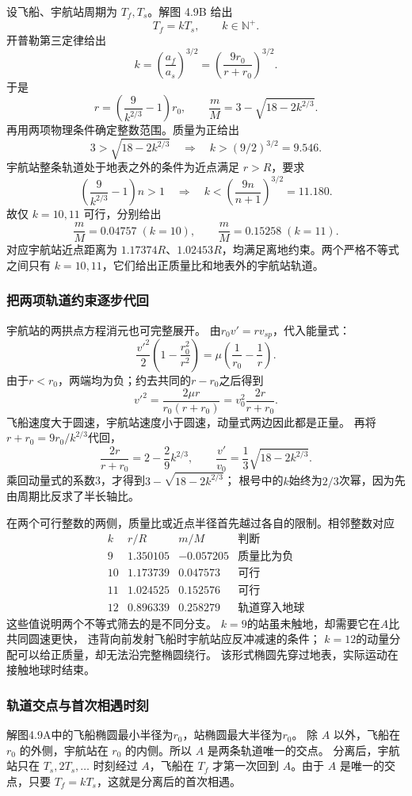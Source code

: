 \documentclass[UTF8,fontset=fandol,a4paper,11pt]{ctexart}
\begin{document}
设飞船、宇航站周期为 $T_f,T_s$。解图 4.9B 给出
\[
T_f=kT_s,\qquad k\in\mathbb N^+.
\]
开普勒第三定律给出
\[
k=\left(\frac{a_f}{a_s}\right)^{3/2}
=\left(\frac{9r_0}{r+r_0}\right)^{3/2}.
\]
于是
\[
r=\left(\frac9{k^{2/3}}-1\right)r_0,
\qquad \boxed{\frac mM=3-\sqrt{18-2k^{2/3}}}.
\]
再用两项物理条件确定整数范围。质量为正给出
\[
3>\sqrt{18-2k^{2/3}}
\quad\Longrightarrow\quad k>(9/2)^{3/2}=9.546.
\]
宇航站整条轨道处于地表之外的条件为近点满足 $r>R$，要求
\[
\left(\frac9{k^{2/3}}-1\right)n>1
\quad\Longrightarrow\quad
k<\left(\frac{9n}{n+1}\right)^{3/2}=11.180.
\]
故仅 $k=10,11$ 可行，分别给出
\[
\boxed{\frac mM=0.04757\;(k=10),\qquad
\frac mM=0.15258\;(k=11)}.
\]
对应宇航站近点距离为 $1.17374R$、$1.02453R$，均满足离地约束。两个严格不等式之间只有 $k=10,11$，它们给出正质量比和地表外的宇航站轨道。
\subsubsection*{把两项轨道约束逐步代回}
宇航站的两拱点方程消元也可完整展开。
由$r_0v'=rv_{sp}$，代入能量式：
\[
\frac{v'^2}2\left(1-\frac{r_0^2}{r^2}\right)
=\mu\left(\frac1{r_0}-\frac1r\right).
\]
由于$r<r_0$，两端均为负；约去共同的$r-r_0$之后得到
\[
v'^2=\frac{2\mu r}{r_0(r+r_0)}
=v_0^2\frac{2r}{r+r_0}.
\]
飞船速度大于圆速，宇航站速度小于圆速，动量式两边因此都是正量。
再将$r+r_0=9r_0/k^{2/3}$代回，
\[
\frac{2r}{r+r_0}
=2-\frac{2}{9}k^{2/3},\qquad
\frac{v'}{v_0}=\frac13\sqrt{18-2k^{2/3}}.
\]
乘回动量式的系数3，才得到$3-\sqrt{18-2k^{2/3}}$；
根号中的$k$始终为$2/3$次幂，因为先由周期比反求了半长轴比。

在两个可行整数的两侧，质量比或近点半径首先越过各自的限制。相邻整数对应
\[
\begin{array}{c|c|c|l}
k&r/R&m/M&\text{判断}\\ \hline
9&1.350105&-0.057205&\text{质量比为负}\\
10&1.173739&0.047573&\text{可行}\\
11&1.024525&0.152576&\text{可行}\\
12&0.896339&0.258279&\text{轨道穿入地球}
\end{array}
\]
这些值说明两个不等式筛去的是不同分支。
$k=9$的站虽未触地，却需要它在$A$比共同圆速更快，
违背向前发射飞船时宇航站应反冲减速的条件；
$k=12$的动量分配可以给正质量，却无法沿完整椭圆绕行。
该形式椭圆先穿过地表，实际运动在接触地球时结束。

\subsubsection*{轨道交点与首次相遇时刻}
解图4.9A中的飞船椭圆最小半径为$r_0$，站椭圆最大半径为$r_0$。
除 $A$ 以外，飞船在 $r_0$ 的外侧，宇航站在 $r_0$ 的内侧。所以 $A$ 是两条轨道唯一的交点。
分离后，宇航站只在 $T_s,2T_s,\ldots$ 时刻经过 $A$，飞船在 $T_f$ 才第一次回到 $A$。由于 $A$ 是唯一的交点，只要 $T_f=kT_s$，这就是分离后的首次相遇。
\end{document}
